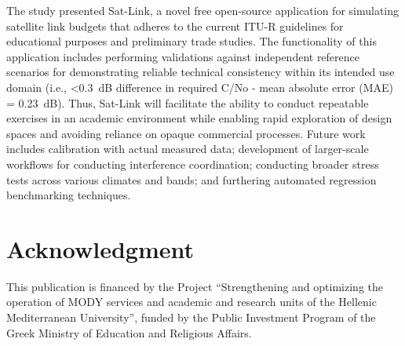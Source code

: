 \documentclass[conference]{IEEEtran}
\begin{document}
The study presented Sat-Link, a novel free open-source application for simulating satellite link budgets that adheres to the current ITU-R guidelines for educational purposes and preliminary trade studies. The functionality of this application includes performing validations against independent reference scenarios for demonstrating reliable technical consistency within its intended use domain (i.e., <0.3~dB difference in required C/No - mean absolute error (MAE) = 0.23~dB). Thus, Sat-Link will facilitate the ability to conduct repeatable exercises in an academic environment while enabling rapid exploration of design spaces and avoiding reliance on opaque commercial processes. Future work includes calibration with actual measured data; development of larger-scale workflows for conducting interference coordination; conducting broader stress tests across various climates and bands; and furthering automated regression benchmarking techniques.

\vspace{0.4\baselineskip}
\section*{Acknowledgment}

This publication is financed by the Project ``Strengthening and optimizing the operation of MODY services and academic and research units of the Hellenic Mediterranean University'', funded by the Public Investment Program of the Greek Ministry of Education and Religious Affairs.
\end{document}
